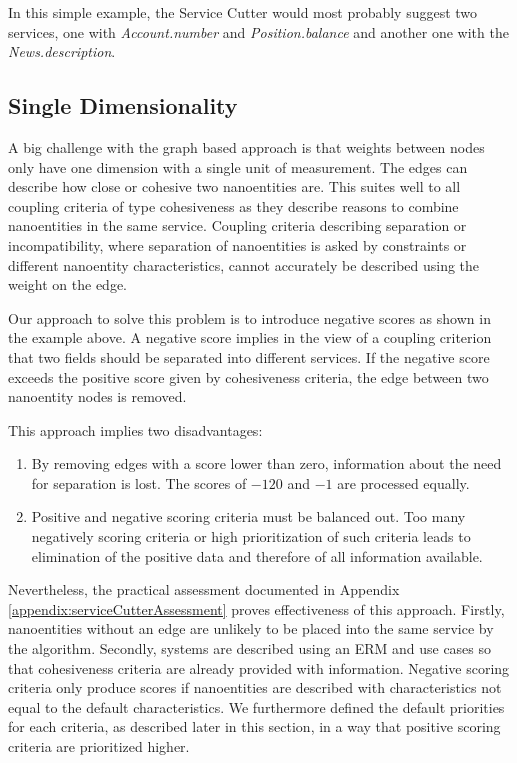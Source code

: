 In this simple example, the Service Cutter would most probably suggest two services, one with \textit{Account.number} and \textit{Position.balance} and another one with the \textit{News.description}.

\subsection{Single Dimensionality}
\label{subsec:singleDimensionality}

A big challenge with the graph based approach is that weights between nodes only have one dimension with a single unit of measurement. The edges can describe how close or cohesive two nanoentities are. This suites well to all coupling criteria of type cohesiveness as they describe reasons to combine nanoentities in the same service. Coupling criteria describing separation or incompatibility, where separation of nanoentities is asked by constraints or different nanoentity characteristics, cannot accurately be described using the weight on the edge.

Our approach to solve this problem is to introduce negative scores as shown in the example above. A negative score implies in the view of a coupling criterion that two fields should be separated into different services. If the negative score exceeds the positive score given by cohesiveness criteria, the edge between two nanoentity nodes is removed. 

This approach implies two disadvantages:

\begin{enumerate}
	\item By removing edges with a score lower than zero, information  about the need for separation is lost. The scores of $-120$ and $-1$ are processed equally. 
	\item Positive and negative scoring criteria must be balanced out. Too many negatively scoring criteria or high prioritization of such criteria leads to elimination of the positive data and therefore of all information available. 
\end{enumerate}


Nevertheless, the practical assessment documented in Appendix \ref{appendix:serviceCutterAssessment} proves effectiveness of this approach. Firstly, nanoentities without an edge are unlikely to be placed into the same service by the algorithm. Secondly, systems are described using an \gls{ERM} and use cases so that cohesiveness criteria are already provided with information. Negative scoring criteria only produce scores if nanoentities are described with characteristics not equal to the default characteristics. We furthermore defined the default priorities for each criteria, as described later in this section, in a way that positive scoring criteria are prioritized higher. 

